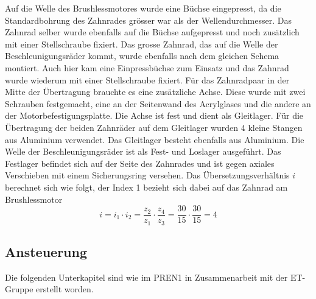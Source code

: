         Auf die Welle des Brushlessmotores wurde eine Büchse eingepresst, da die Standardbohrung des 
        Zahnrades grösser war als der Wellendurchmesser. Das Zahnrad selber wurde ebenfalls auf die 
        Büchse aufgepresst und noch zusätzlich mit einer Stellschraube fixiert. Das grosse Zahnrad, 
        das auf die Welle der Beschleunigungsräder kommt, wurde ebenfalls nach dem gleichen Schema 
        montiert. Auch hier kam eine Einpressbüchse zum Einsatz und das Zahnrad wurde wiederum mit 
        einer Stellschraube fixiert. Für das Zahnradpaar in der Mitte der Übertragung brauchte es eine 
        zusätzliche Achse. Diese wurde mit zwei Schrauben festgemacht, eine an der Seitenwand des 
        Acrylglases und die andere an der Motorbefestigungsplatte. Die Achse ist fest und dient als 
        Gleitlager. Für die Übertragung der beiden Zahnräder auf dem Gleitlager wurden 4 kleine Stangen 
        aus Aluminium verwendet. Das Gleitlager besteht ebenfalls aus Aluminium. Die Welle der 
        Beschleunigungsräder ist als Fest- und Loslager ausgeführt. Das Festlager befindet sich auf 
        der Seite des Zahnrades und ist gegen axiales Verschieben mit einem Sicherungsring versehen. 
        Das Übersetzungsverhältnis $i$ berechnet sich wie folgt, der Index 1 bezieht sich dabei auf 
        das Zahnrad am Brushlessmotor
        \begin{equation}
            i = i_1 \cdot i_2 = \frac{z_2}{z_1} \cdot \frac{z_4}{z_3} = \frac{30}{15} \cdot \frac{30}{15} = 4
        \end{equation}
%
\subsection{Ansteuerung}
Die folgenden Unterkapitel sind wie im PREN1 in Zusammenarbeit mit der ET-Gruppe erstellt worden.


